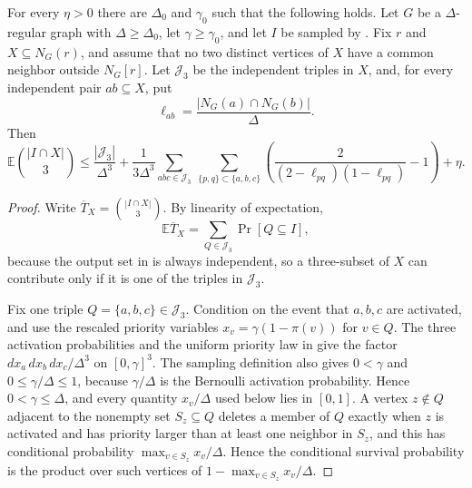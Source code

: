 \begin{lemma}
For every $\eta>0$ there are $\Delta_0$ and $\gamma_0$ such that the
following holds.  Let $G$ be a $\Delta$-regular graph with
$\Delta\ge\Delta_0$, let $\gamma\ge\gamma_0$, and let $I$ be sampled by
.  Fix $r$ and
$X\subseteq N_G(r)$, and assume that no two distinct vertices of $X$ have a
common neighbor outside $N_G[r]$.  Let $\mathcal J_3$ be the independent
triples in $X$, and, for every independent pair $ab\subseteq X$, put
\[
\ell_{ab}=\frac{|N_G(a)\cap N_G(b)|}{\Delta}.
\]
Then
\[
\mathbb E\binom{|I\cap X|}{3}
\le
\frac{|\mathcal J_3|}{\Delta^3}
+\frac{1}{3\Delta^3}
\sum_{abc\in\mathcal J_3}\ \sum_{\{p,q\}\subset\{a,b,c\}}
\left(\frac{2}{(2-\ell_{pq})(1-\ell_{pq})}-1\right)
+\eta .
\]
\end{lemma}
\begin{proof}
Write $\overline T_X=\binom{|I\cap X|}{3}$.  By linearity of expectation,
\[
\mathbb E\overline T_X
=\sum_{Q\in\mathcal J_3}\Pr[Q\subseteq I],
\]
because the output set in  is always
independent, so a three-subset of $X$ can contribute only if it is one of the
triples in $\mathcal J_3$.

Fix one triple $Q=\{a,b,c\}\in\mathcal J_3$.  Condition on the event that
$a,b,c$ are activated, and use the rescaled priority variables
$x_v=\gamma(1-\pi(v))$ for $v\in Q$.  The three activation probabilities and
the uniform priority law in  give the
factor $dx_a\,dx_b\,dx_c/\Delta^3$ on $[0,\gamma]^3$.  The sampling
definition also gives $0<\gamma$ and $0\le\gamma/\Delta\le1$, because
$\gamma/\Delta$ is the Bernoulli activation probability.  Hence
$0<\gamma\le\Delta$, and every quantity $x_v/\Delta$ used below lies in
$[0,1]$.  A vertex
$z\notin Q$ adjacent to the nonempty set $S_z\subseteq Q$ deletes a member of
$Q$ exactly when $z$ is activated and has priority larger than at least one
neighbor in $S_z$, and this has conditional probability
$\max_{v\in S_z}x_v/\Delta$.  Hence the conditional survival probability is
the product over such vertices of
$1-\max_{v\in S_z}x_v/\Delta$.


\end{proof}

